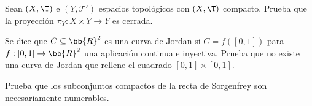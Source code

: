 \begin{ejercicio}
Sean $(X, \T)$ e $(Y, \mathcal{T'})$ espacios topológicos con $(X, \T)$ compacto. Prueba que la proyección $\pi_Y: X \times Y \to Y$ es cerrada.
\end{ejercicio}

\begin{ejercicio}
Se dice que $C \subseteq \bb{R}^2$ es una curva de Jordan si $C = f([0, 1])$ para $f: [0, 1] \to \bb{R}^2$ una aplicación continua e inyectiva. Prueba que no existe una curva de Jordan que rellene el cuadrado $[0, 1] \times [0, 1]$.
\end{ejercicio}


\begin{ejercicio}
    Prueba que los subconjuntos compactos de la recta de Sorgenfrey son necesariamente
numerables.
\end{ejercicio}